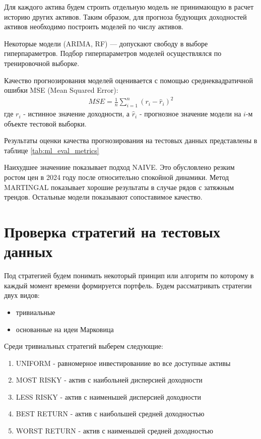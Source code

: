 Для каждого актива будем строить отдельную модель не принимающую в расчет историю других активов.
Таким образом, для прогноза будующих доходностей активов необходимо построить моделей по числу активов.

Некоторые модели (ARIMA, RF) --- допускают свободу в выборе гиперпараметров. 
Подбор гиперпараметров моделей осуществлялся по тренировочной выборке.

Качество прогнозирования моделей оценивается с помощью среднеквадратичной ошибки MSE (Mean Squared Error):
\begin{align}
	MSE = \frac{1}{n} \sum_{i=1}^{n} (r_i - \hat{r}_i)^2
\end{align}
где $r_i$ - истинное значение доходности,
а $\hat{r}_i$ - прогнозное значение модели на $i$-м объекте тестовой выборки.

Результаты оценки качества прогнозирования на тестовых данных представлены в таблице \ref{tab:ml_eval_metrics}



Наихудшее значениие показывает подход NAIVE.
Это обусловлено резким ростом цен в 2024 году после относительно спокойной динамики.
Метод MARTINGAL показывает хорошие результаты в случае рядов с затяжным трендов.
Остальные модели показывают сопоставимое качество.

\section{Проверка стратегий на тестовых данных}

Под стратегией будем понимать некоторый принцип или алгоритм по которому в каждый момент времени
формируется портфель.
Будем рассматривать стратегии двух видов:
\begin{itemize}
	\item тривиальные 
	\item основанные на идеи Марковица
\end{itemize}

Среди тривиальных стратегий выберем следующие:
\begin{enumerate}
	\item UNIFORM - равномерное инвестированиие во все доступные активы
	\item MOST RISKY - актив с наибольней дисперсией доходности
	\item LESS RISKY - актив с наименьшей дисперсией доходности
	\item BEST RETURN - актив с наибольшей средней доходностью
	\item WORST RETURN - актив с наименьшей средней доходностью
\end{enumerate}

